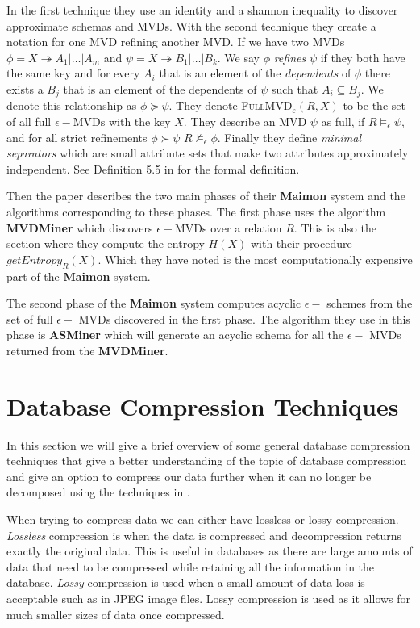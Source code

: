 \documentclass[logo,bsc,singlespacing,parskip,online]{infthesis}
\begin{document}
In the first technique they use an identity and a shannon inequality to discover approximate schemas and MVDs. With the second technique they create a notation for one MVD refining another MVD. If we have two MVDs $\phi = X \twoheadrightarrow A_1|\ldots|A_m$ and  $\psi = X \twoheadrightarrow B_1|\ldots|B_k$. We say $\phi$ \emph{refines} $\psi$ if they both have the same key and for every $A_i$ that is an element of the \emph{dependents} of $\phi$ there exists a $B_j$ that is an element of the dependents of $\psi$ such that $A_i \subseteq B_j$. We denote this relationship as $\phi \succeq \psi$. They denote \textsc{FullMVD}$_{\varepsilon}(R, X)$ to be the set of all full $\epsilon-\mathrm{MVDs}$ with the key $X$. They describe an MVD $\psi$ as full, if $R \models_\epsilon \psi$, and for all strict refinements $\phi \succ \psi$ $R \nvDash_\epsilon \phi$. Finally they define \emph{minimal separators} which are small attribute sets that make two attributes approximately independent. See Definition 5.5 in \citet{DBLP:conf/sigmod/KenigMPSS20} for the formal definition.

Then the paper describes the two main phases of their \textbf{Maimon} system and the algorithms corresponding to these phases. The first phase uses the algorithm \textbf{MVDMiner} which discovers $\epsilon-$MVDs over a relation $R$. This is also the section where they compute the entropy $H(X)$ with their procedure $getEntropy_R(X)$. Which they have noted is the most computationally expensive part of the \textbf{Maimon} system.

The second phase of the \textbf{Maimon} system computes acyclic $\epsilon-$ schemes from the set of full $\epsilon-$ MVDs discovered in the first phase. The algorithm they use in this phase is \textbf{ASMiner} which will generate an acyclic schema for all the $\epsilon-$ MVDs returned from the \textbf{MVDMiner}.




\section{Database Compression Techniques}
In this section we will give a brief overview of some general database compression techniques that give a better understanding of the topic of database compression and give an option to compress our data further when it can no longer be decomposed using the techniques in \citep{DBLP:conf/sigmod/KenigMPSS20}.

When trying to compress data we can either have lossless or lossy compression. \emph{Lossless} compression is when the data is compressed and decompression returns exactly the original data. This is useful in databases as there are large amounts of data that need to be compressed while retaining all the information in the database. \emph{Lossy} compression is used when a small amount of data loss is acceptable such as in JPEG image files. Lossy compression is used as it allows for much smaller sizes of data once compressed.
\end{document}
